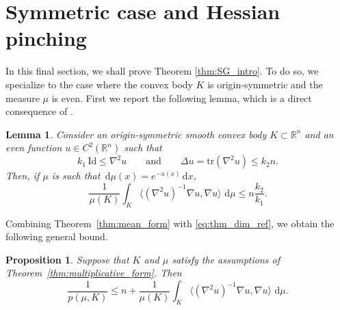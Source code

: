 \documentclass[a4paper, 11pt]{article}
\newcommand{\R}{\mathbb{R}}
\newcommand{\tra}{\mathrm{tr}}
\newtheorem{proposition}[theorem]{Proposition}
\newtheorem{lemma}[theorem]{Lemma}
\theoremstyle{definition}
\newcommand{\di}{\, \mathrm{d}}
\begin{document}
\section{Symmetric case and Hessian pinching}

In this final section, we shall prove Theorem \ref{thm:SG_intro}. To do so, we specialize to the case where the convex body $K$ is origin-symmetric and the measure $\mu$ is even. First we report the following lemma, which is a direct consequence of \cite[Lemma 5.1]{Kol_Liv_Gardner-Zvavitch}.
\begin{lemma}\label{lem:radial_bound}
Consider an origin-symmetric smooth convex body $K \subset \R^n$ and an even function $u \in C^2(\R^n)$ such that
\[
k_{1}\,\mathrm{Id} \leq \nabla^{2}u
\qquad\text{and}\qquad
\Delta u=\tra(\nabla^{2}u)\leq k_{2}n.
\]
Then, if $\mu$ is such that $\di\mu(x)=e^{-u(x)}\di x$,
\begin{equation}\label{eq:measure_moment_estimate}
\frac{1}{\mu(K)}\int_{K}
\langle (\nabla^{2}u)^{-1}\nabla u,\nabla u\rangle\,\di\mu
\leq
n\frac{k_{2}}{k_{1}}.
\end{equation}
\end{lemma}
Combining Theorem~\ref{thm:mean_form} with \eqref{eq:thm_dim_ref}, we obtain the following general bound.
\begin{proposition}\label{prop:concavity_general_bound}
Suppose that $K$ and $\mu$ satisfy the assumptions of Theorem~\ref{thm:multiplicative_form}. Then
\[
\frac{1}{p(\mu,K)}
\leq n+\frac{1}{\mu(K)}\int_{K}\langle (\nabla^{2}u)^{-1}\nabla u,\nabla u\rangle\,\di\mu.
\]
\end{proposition}
\end{document}
